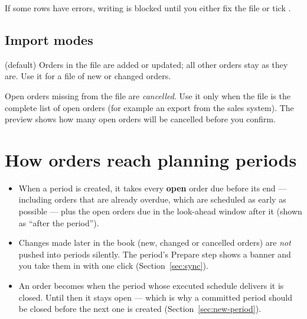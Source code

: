 If some rows have errors, writing is blocked until you either fix the file or tick .

\subsection{Import modes}

\begin{description}[style=nextline, leftmargin=1.2em, font=\bfseries\color{brand}]
  \item[Add \& update] (default) Orders in the file are added or updated; all other orders stay as they are.
        Use it for a file of new or changed orders.
  \item[Replace all open orders] Open orders missing from the file are \emph{cancelled}. Use it only when the
        file is the complete list of open orders (for example an export from the sales system). The preview
        shows how many open orders will be cancelled before you confirm.
\end{description}

\section{How orders reach planning periods}\label{sec:orders-periods}

\begin{itemize}
  \item When a period is created, it takes every \textbf{open} order due before its end --- including orders
        that are already overdue, which are scheduled as early as possible --- plus the open orders due in
        the look-ahead window after it (shown as ``after the period'').
  \item Changes made later in the book (new, changed or cancelled orders) are \emph{not} pushed into periods
        silently. The period's Prepare step shows a banner and you take them in with one click
        (Section~\ref{sec:sync}).
  \item An order becomes  when the period whose executed schedule delivers it is closed. Until
        then it stays open --- which is why a committed period should be closed before the next one is
        created (Section~\ref{sec:new-period}).
\end{itemize}
